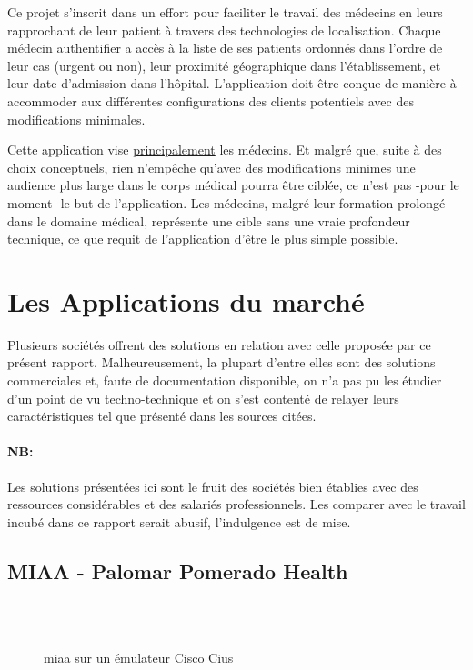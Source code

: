 Ce projet s'inscrit dans un effort pour faciliter le travail des médecins en
leurs rapprochant de leur patient à travers des technologies de localisation.
Chaque médecin authentifier a accès à la liste de ses patients ordonnés dans
l'ordre de leur cas (urgent ou non), leur proximité géographique dans
l’établissement, et leur date d’admission dans l'hôpital. L'application doit
être conçue de manière à accommoder aux différentes configurations des clients
potentiels avec des modifications minimales.

Cette application vise \underline{principalement} les médecins. Et
malgré que, suite à des choix conceptuels, rien n’empêche qu’avec des
modifications minimes une audience plus large dans le corps médical
pourra être ciblée, ce n’est pas -pour le moment- le but de
l’application. Les médecins, malgré leur formation prolongé dans le
domaine médical, représente une cible sans une vraie profondeur
technique, ce que requit de l’application d’être le plus simple
possible.


\section{Les Applications  du marché}

Plusieurs sociétés offrent des solutions en relation avec celle proposée
par ce présent rapport. Malheureusement, la plupart d’entre elles sont
des solutions commerciales et, faute de documentation disponible, on n’a
pas pu les étudier d’un point de vu techno-technique et on s’est
contenté de relayer leurs caractéristiques tel que présenté dans les
sources citées.

\paragraph{NB:} %
\label{par:nb}

Les solutions présentées ici sont le fruit des sociétés bien établies avec des ressources considérables et des salariés professionnels. Les comparer avec le travail incubé dans ce rapport serait abusif, l’indulgence est de mise.

\subsection{MIAA - Palomar Pomerado Health}

\begin{figure}
\centering
{}\\
\\
\caption{\gls{miaa} sur un émulateur Cisco Cius}
\label{fig:miaa}
\end{figure}

